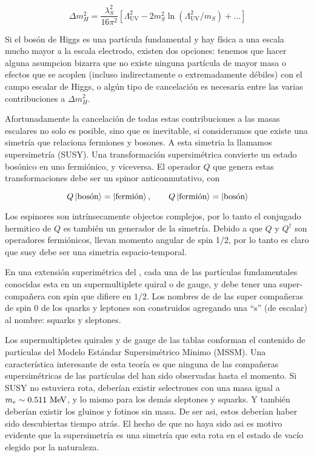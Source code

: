 \begin{equation}
  \Delta m_H^2 = \frac{\lambda_S^2}{16\pi^2} \left[ \Lambda^2_\text{UV} - 2 m_S^2 \ln (\Lambda^2_\text{UV}/m_S) +  \ldots \right]
\end{equation}

Si el bosón de Higgs es una partícula fundamental y hay física a una escala mucho mayor a la
escala electrodo, existen dos opciones: tenemos que hacer alguna asumpcion bizarra que no existe ninguna
partícula de mayor masa o efectos que se acoplen (incluso indirectamente o extremadamente débiles) con el
campo escalar de Higgs, o algún tipo de  cancelación es necesaria entre las varias contribuciones a $\Delta m_H^2$.


Afortunadamente la cancelaci\'on de todas estas contribuciones a las masas escalares no solo es posible,
sino que es inevitable, si consideramos que existe una simetría que relaciona fermiones y bosones.
A esta simetria la llamamos supersimetría (SUSY).
Una transformación supersimétrica convierte un estado bosónico en uno fermiónico, y viceversa.
El operador $Q$ que genera estas transformaciones debe ser un spinor anticonmutativo, con

\begin{equation}
  Q \left| \text{bos\'on} \right> = \left| \text{fermi\'on} \right>, \quad \quad Q \left| \text{fermi\'on} \right> = \left| \text{bos\'on} \right>
\end{equation}

Los espinores son intrínsecamente objectos complejos, por lo tanto el conjugado hermitico de $Q$ es también
un generador de la simetría. Debido a que $Q$ y $Q^\dagger$ son operadores fermiónicos,
llevan momento angular de spin 1/2, por lo tanto es claro que susy debe ser una simetria espacio-temporal.

En una extensión superimétrica del {\SM}, cada una de las part\'iculas fundamentales conocidas esta en un supermultiplete
quiral o de gauge, y debe tener una super-compa\~nera con spin que difiere en $1/2$.
Los nombres de de las super compa\~neras de spin 0 de los quarks y leptones son construidos agregando
una ``s'' (de escalar) al nombre: squarks y sleptones.

Los supermultipletes quirales y de gauge de las tablas conforman el contenido de partículas del Modelo
Estándar Supersimétrico Mínimo (MSSM). Una característica interesante de esta teoría es que ninguna
de las compa\~neras supersimétricas de las partículas del {\SM} han sido observadas hasta el momento.
Si SUSY no estuviera rota, deberían existir selectrones con una masa igual a $m_e \sim 0.511 \mev$,
y lo mismo para los demás sleptones y squarks. Y también deberían existir los
gluinos y fotinos sin masa. De ser asi, estos deberían haber sido descubiertas tiempo atrás. El hecho
de que no haya sido asi es motivo evidente que la supersimetría es una simetría que esta rota en el
estado de vacío elegido por la naturaleza.


